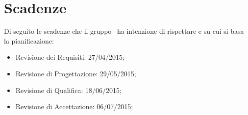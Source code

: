 \section{Scadenze}{
\label{sec:scadenze}
Di seguito le scadenze che il gruppo \gruppo~ha intenzione di rispettare e su cui si basa la pianificazione:
\begin{itemize}
	\item Revisione dei Requisiti: 27/04/2015;
	\item Revisione di Progettazione: 29/05/2015;
	\item Revisione di Qualifica: 18/06/2015;
	\item Revisione di Accettazione: 06/07/2015;
\end{itemize}
}